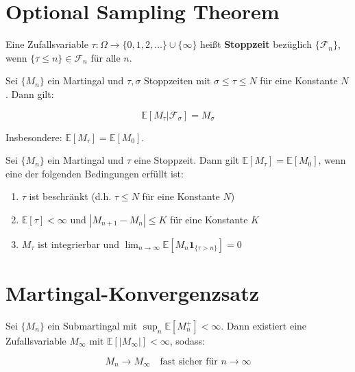 \section{Optional Sampling Theorem}

\begin{definition}[Stoppzeit]
Eine Zufallsvariable $\tau: \Omega \to \{0, 1, 2, \ldots\} \cup \{\infty\}$ heißt \textbf{Stoppzeit} bezüglich $\{\mathcal{F}_n\}$, wenn $\{\tau \leq n\} \in \mathcal{F}_n$ für alle $n$.
\end{definition}

\begin{theorem}
Sei $\{M_n\}$ ein Martingal und $\tau, \sigma$ Stoppzeiten mit $\sigma \leq \tau \leq N$ für eine Konstante $N$. Dann gilt:

\begin{equation}
\mathbb{E}[M_\tau | \mathcal{F}_\sigma] = M_\sigma
\end{equation}

Insbesondere: $\mathbb{E}[M_\tau] = \mathbb{E}[M_0]$.
\end{theorem}

\begin{theorem}
Sei $\{M_n\}$ ein Martingal und $\tau$ eine Stoppzeit. Dann gilt $\mathbb{E}[M_\tau] = \mathbb{E}[M_0]$, wenn eine der folgenden Bedingungen erfüllt ist:

\begin{enumerate}
    \item $\tau$ ist beschränkt (d.h. $\tau \leq N$ für eine Konstante $N$)
    \item $\mathbb{E}[\tau] < \infty$ und $|M_{n+1} - M_n| \leq K$ für eine Konstante $K$
    \item $M_\tau$ ist integrierbar und $\lim_{n \to \infty} \mathbb{E}[M_n \mathbf{1}_{\{\tau > n\}}] = 0$
\end{enumerate}
\end{theorem}

\section{Martingal-Konvergenzsatz}

\begin{theorem}
Sei $\{M_n\}$ ein Submartingal mit $\sup_n \mathbb{E}[M_n^+] < \infty$. Dann existiert eine Zufallsvariable $M_\infty$ mit $\mathbb{E}[|M_\infty|] < \infty$, sodass:

\begin{equation}
M_n \to M_\infty \quad \text{fast sicher für } n \to \infty
\end{equation}
\end{theorem}

